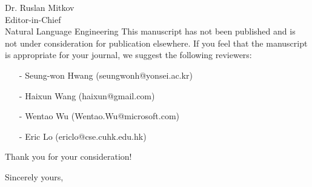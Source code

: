 \documentclass[11pt]{letter} %
\begin{document}
\begin{letter}{Dr. Ruslan Mitkov \\
Editor-in-Chief  \\
Natural Language Engineering}
This manuscript has not been published and is not under
consideration for publication elsewhere. 
If you feel that the manuscript is appropriate for your journal, 
we suggest the following reviewers: 
\begin{enumerate}
	\item[-] Seung-won Hwang (seungwonh@yonsei.ac.kr)
	\item[-] Haixun Wang (haixun@gmail.com)
	\item[-] Wentao Wu (Wentao.Wu@microsoft.com)
	\item[-] Eric Lo (ericlo@cse.cuhk.edu.hk)
\end{enumerate}

Thank you for your consideration!

\closing{Sincerely yours,}




\end{letter}
\end{document}
